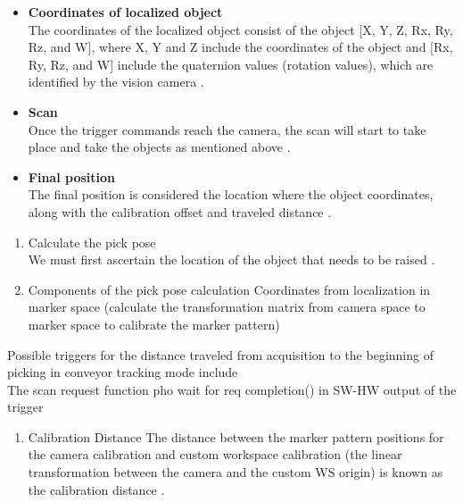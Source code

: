 \documentclass[12pt]{article}
\begin{document}
\begin{itemize}
\item \textbf{Coordinates of localized object}\\
The coordinates of the localized object consist of the object [X, Y, Z, Rx, Ry, Rz, and W], where X, Y and Z include the coordinates of the object and [Rx, Ry, Rz, and W] include the quaternion values (rotation values), which are identified by the vision camera \cite{ref21}.

\item \textbf{ Scan}\\
Once the trigger commands reach the camera, the scan will start to take place and take the objects as mentioned above \cite{ref21}.
\item \textbf{Final position} \\ 
The final position is considered the location where the object coordinates, along with the calibration offset and traveled distance \cite{ref21}.
\end{itemize}

\begin{enumerate}
\item {Calculate the pick pose} \\
We must first ascertain the location of the object that needs to be raised \cite{ref21}.

\item {Components of the pick pose calculation}
 Coordinates from localization in marker space (calculate the transformation matrix from camera space to marker space to calibrate the marker pattern)\cite{ref21}

\end{enumerate}
Possible triggers for the distance traveled from acquisition to the beginning of picking in conveyor tracking mode include\\

The scan request function pho wait for req completion() in SW-HW output of the trigger \\

\begin{enumerate}
\item{Calibration Distance}
The distance between the marker pattern positions for the camera calibration and custom workspace calibration (the linear transformation between the camera and the custom WS origin) is known as the calibration distance \cite{ref21}.\\
\end{enumerate}
\end{document}

